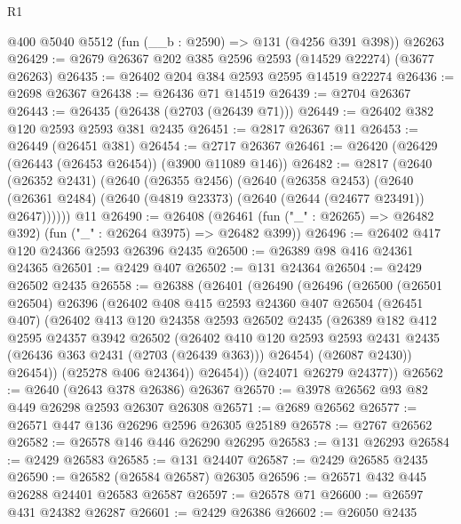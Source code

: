 \begin{lexlean}{R1}
\begin{coremodule}
    @400
    @5040
    @5512
    (fun (__b : @2590) => @131 (@4256 @391 @398))
    @26263
@26429 := @2679 @26367 @202 @385 @2596 @2593 (@14529 @22274) (@3677 @26263)
@26435 := @26402 @204 @384 @2593 @2595 @14519 @22274
@26436 := @2698 @26367
@26438 := @26436 @71 @14519
@26439 := @2704 @26367
@26443 := @26435 (@26438 (@2703 (@26439 @71)))
@26449 := @26402 @382 @120 @2593 @2593 @381 @2435
@26451 := @2817 @26367 @11
@26453 := @26449 (@26451 @381)
@26454 := @2717 @26367
@26461 := @26420 (@26429 (@26443 (@26453 @26454)) (@3900 @11089 @146))
@26482 := @2817
    (@2640
      (@26352 @2431)
      (@2640
        (@26355 @2456)
        (@2640
          (@26358 @2453)
          (@2640 (@26361 @2484) (@2640 (@4819 @23373) (@2640 (@2644 (@24677 @23491)) @2647))))))
    @11
@26490 := @26408
    (@26461 (fun ("_" : @26265) => @26482 @392) (fun ("_" : @26264 @3975) => @26482 @399))
@26496 := @26402 @417 @120 @24366 @2593 @26396 @2435
@26500 := @26389 @98 @416 @24361 @24365
@26501 := @2429 @407
@26502 := @131 @24364
@26504 := @2429 @26502 @2435
@26558 := @26388
    (@26401
      (@26490
        (@26496
          (@26500
            (@26501 @26504)
            @26396
            (@26402
              @408
              @415
              @2593
              @24360
              @407
              @26504
              (@26451 @407)
              (@26402
                @413
                @120
                @24358
                @2593
                @26502
                @2435
                (@26389
                  @182
                  @412
                  @2595
                  @24357
                  @3942
                  @26502
                  (@26402
                    @410
                    @120
                    @2593
                    @2593
                    @2431
                    @2435
                    (@26436 @363 @2431 (@2703 (@26439 @363)))
                    @26454)
                  (@26087 @2430))
                @26454))
            (@25278 @406 @24364))
          @26454))
      (@24071 @26279 @24377))
@26562 := @2640 (@2643 @378 @26386) @26367
@26570 := @3978 @26562 @93 @82 @449 @26298 @2593 @26307 @26308
@26571 := @2689 @26562
@26577 := @26571 @447 @136 @26296 @2596 @26305 @25189
@26578 := @2767 @26562
@26582 := @26578 @146 @446 @26290 @26295
@26583 := @131 @26293
@26584 := @2429 @26583
@26585 := @131 @24407
@26587 := @2429 @26585 @2435
@26590 := @26582 (@26584 @26587) @26305
@26596 := @26571 @432 @445 @26288 @24401 @26583 @26587
@26597 := @26578 @71
@26600 := @26597 @431 @24382 @26287
@26601 := @2429 @26386
@26602 := @26050 @2435

\end{coremodule}
\end{lexlean}
